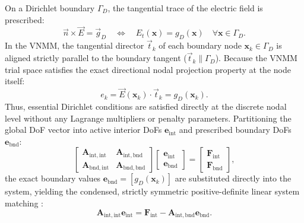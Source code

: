 \documentclass[preprint,12pt]{elsarticle}
\begin{document}
On a Dirichlet boundary $\Gamma_D$, the tangential trace of the electric field is prescribed:
\begin{equation}
    \vec{n} \times \vec{E} = \vec{g}_D \quad \iff \quad E_t(\mathbf{x}) = g_D(\mathbf{x}) \quad \forall \mathbf{x} \in \Gamma_D.
    \label{eq:dirichlet_prescribed}
\end{equation}
In the VNMM, the tangential director $\vec{t}_k$ of each boundary node $\mathbf{x}_k \in \Gamma_D$ is aligned strictly parallel to the boundary tangent ($\vec{t}_k \parallel \Gamma_D$). Because the VNMM trial space satisfies the exact directional nodal projection property at the node itself:
\begin{equation}
    e_k = \vec{E}(\mathbf{x}_k) \cdot \vec{t}_k = g_D(\mathbf{x}_k).
    \label{eq:dirichlet_nodal_value}
\end{equation}
Thus, essential Dirichlet conditions are satisfied directly at the discrete nodal level without any Lagrange multipliers or penalty parameters. Partitioning the global DoF vector into active interior DoFs $\mathbf{e}_{\mathrm{int}}$ and prescribed boundary DoFs $\mathbf{e}_{\mathrm{bnd}}$:
\begin{equation}
    \begin{bmatrix}
        \mathbf{A}_{\mathrm{int}, \mathrm{int}} & \mathbf{A}_{\mathrm{int}, \mathrm{bnd}} \\
        \mathbf{A}_{\mathrm{bnd}, \mathrm{int}} & \mathbf{A}_{\mathrm{bnd}, \mathrm{bnd}}
    \end{bmatrix}
    \begin{bmatrix}
        \mathbf{e}_{\mathrm{int}} \\
        \mathbf{e}_{\mathrm{bnd}}
    \end{bmatrix}
    =
    \begin{bmatrix}
        \mathbf{F}_{\mathrm{int}} \\
        \mathbf{F}_{\mathrm{bnd}}
    \end{bmatrix},
\end{equation}
the exact boundary values $\mathbf{e}_{\mathrm{bnd}} = [g_D(\mathbf{x}_k)]$ are substituted directly into the system, yielding the condensed, strictly symmetric positive-definite linear system matching \cite{stable_vnmm2d_2026}:
\begin{equation}
    \mathbf{A}_{\mathrm{int}, \mathrm{int}} \mathbf{e}_{\mathrm{int}} = \mathbf{F}_{\mathrm{int}} - \mathbf{A}_{\mathrm{int}, \mathrm{bnd}} \mathbf{e}_{\mathrm{bnd}}.
    \label{eq:dirichlet_condensed_system}
\end{equation}
\end{document}
